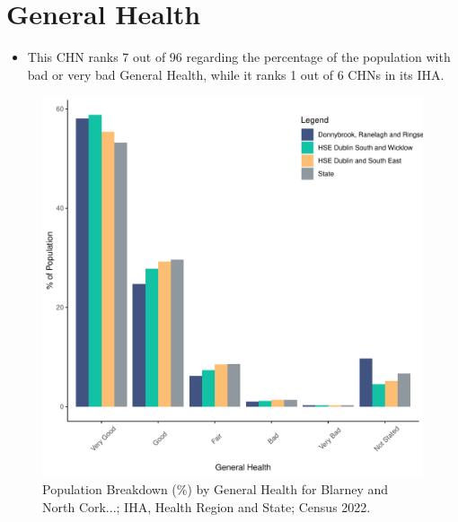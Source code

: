 \documentclass{article}
\begin{document}
\pagebreak

\section{General Health}\label{sect:GenHealth}
\begin{itemize}
\item  This CHN ranks  7 out of 96 regarding the percentage of the population with bad or very bad General Health, while it ranks   1 out of 6 CHNs in its IHA.
\end{itemize}
\begin{figure}[h]
	\centering
	\includegraphics[width = 150mm]{../figures/GenED.pdf}
	\caption{Population Breakdown (\%) by General Health for Blarney and North Cork...; IHA, Health Region and State;  Census 2022.}
	\label{fig:2ae19629-1a6a-13a3-e055-000000000001}
	\end{figure}
\end{document}
